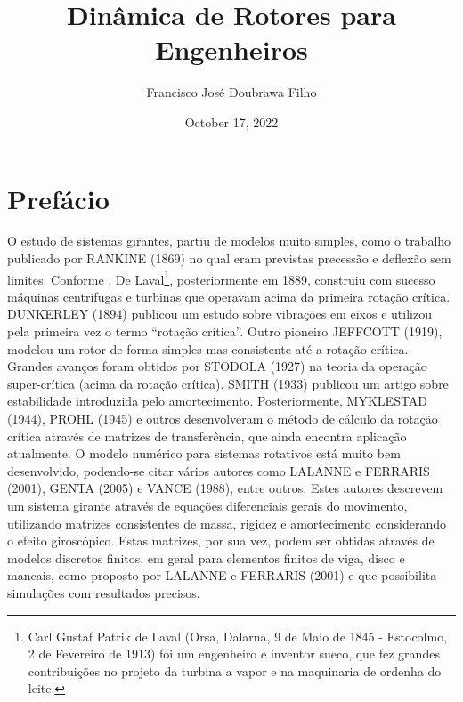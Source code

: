 \documentclass[a4paper]{book}
\title{Dinâmica de Rotores para Engenheiros}
\author{Francisco José Doubrawa Filho}
\date{October 17, 2022}
\begin{document}
\maketitle
\chapter{Prefácio}
O estudo de sistemas girantes, partiu de modelos muito simples, como o trabalho publicado por RANKINE (1869) no qual eram previstas precessão e deflexão sem limites. Conforme \cite{genta05}, De Laval\footnote{Carl Gustaf Patrik de Laval (Orsa, Dalarna, 9 de Maio de 1845 - Estocolmo, 2 de Fevereiro de 1913) foi um engenheiro e inventor sueco, que fez grandes contribuições no projeto da turbina a vapor e na maquinaria de ordenha do leite.}, posteriormente em 1889, construiu com sucesso máquinas centrífugas e turbinas que operavam acima da primeira rotação crítica. DUNKERLEY (1894) publicou um estudo sobre vibrações em eixos e utilizou pela primeira vez o termo “rotação crítica”.
Outro pioneiro JEFFCOTT (1919), modelou um rotor de forma simples mas consistente até a rotação crítica. Grandes avanços foram obtidos por STODOLA (1927) na teoria da operação super-crítica (acima da rotação crítica). SMITH (1933) publicou um artigo sobre estabilidade introduzida pelo amortecimento. Posteriormente, MYKLESTAD (1944), PROHL (1945) e outros desenvolveram o método de cálculo da rotação crítica através de matrizes de transferência, que ainda encontra aplicação atualmente.
O modelo numérico para sistemas rotativos está muito bem desenvolvido, podendo-se citar vários autores como LALANNE e FERRARIS (2001), GENTA (2005) e VANCE (1988), entre outros. Estes autores descrevem um sistema girante através de equações diferenciais gerais do movimento, utilizando matrizes consistentes de massa, rigidez e amortecimento considerando o efeito giroscópico. Estas matrizes, por sua vez, podem ser obtidas através de modelos discretos finitos, em geral para elementos finitos de viga, disco e mancais, como proposto por LALANNE e FERRARIS (2001) e que possibilita simulações com resultados precisos.
\frontmatter
\mainmatter
\end{document}
